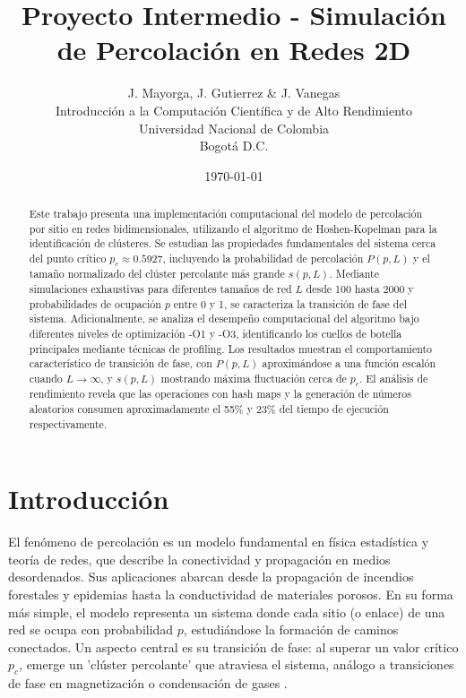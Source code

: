 \documentclass[12pt,a4paper]{article}
\title{Proyecto Intermedio - Simulación de Percolación en Redes 2D}
\author{J. Mayorga, J. Gutierrez \& J. Vanegas\\
        Introducción a la Computación Científica y de Alto Rendimiento \\
        Universidad Nacional de Colombia\\
        Bogotá D.C.}
\date{\today}
\begin{document}
\maketitle

\begin{abstract}
Este trabajo presenta una implementación computacional del modelo de percolación por sitio en redes bidimensionales, utilizando el algoritmo de Hoshen-Kopelman para la identificación de clústeres. Se estudian las propiedades fundamentales del sistema cerca del punto crítico $p_c \approx 0.5927$, incluyendo la probabilidad de percolación $P(p,L)$ y el tamaño normalizado del clúster percolante más grande $s(p,L)$. Mediante simulaciones exhaustivas para diferentes tamaños de red $L$ desde 100 hasta 2000 y probabilidades de ocupación $p$ entre 0 y 1, se caracteriza la transición de fase del sistema. Adicionalmente, se analiza el desempeño computacional del algoritmo bajo diferentes niveles de optimización -O1 y -O3, identificando los cuellos de botella principales mediante técnicas de profiling. Los resultados muestran el comportamiento característico de transición de fase, con $P(p,L)$ aproximándose a una función escalón cuando $L \rightarrow \infty$, y $s(p,L)$ mostrando máxima fluctuación cerca de $p_c$. El análisis de rendimiento revela que las operaciones con hash maps y la generación de números aleatorios consumen aproximadamente el 55\% y 23\% del tiempo de ejecución respectivamente.
\end{abstract}

\section{Introducción}

El fenómeno de percolación es un modelo fundamental en física estadística y teoría de redes, que describe la conectividad y propagación en medios desordenados. Sus aplicaciones abarcan desde la propagación de incendios forestales y epidemias hasta la conductividad de materiales porosos. En su forma más simple, el modelo representa un sistema donde cada sitio (o enlace) de una red se ocupa con probabilidad \( p \), estudiándose la formación de caminos conectados. Un aspecto central es su transición de fase: al superar un valor crítico \( p_c \), emerge un 'clúster percolante' que atraviesa el sistema, análogo a transiciones de fase en magnetización o condensación de gases \cite{CantabranaBarrio2018, PERCentralPercolation}.
\\
\end{document}
